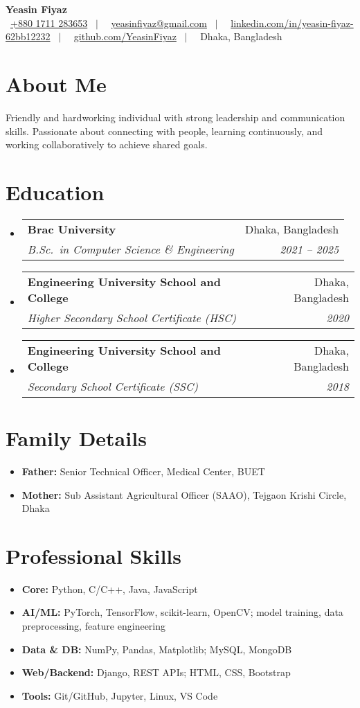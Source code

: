 \documentclass[letterpaper,11pt]{article}
\makeatletter
\newcommand{\resumeSubheading}[4]{%
  \vspace{2pt}\item
  \begin{tabular*}{0.97\textwidth}[t]{l@{\extracolsep{\fill}}r}
  \textbf{#1} & #2 \\
  \textit{\small #3} & \textit{\small #4} \\
  \end{tabular*}\vspace{-6pt}
}
\newcommand{\resumeSubHeadingListStart}{\begin{itemize}[leftmargin=0.15in, label={}]}
\newcommand{\resumeSubHeadingListEnd}{\end{itemize}}
\makeatother
\begin{document}
\begin{center}
    {\Huge \bfseries Yeasin Fiyaz} \\[-1pt]
    \small
    \faMobile\ \href{tel:+8801711283653}{+880 1711 283653} \ $|$ \
    \faAt\ \href{mailto:yeasinfiyaz@gmail.com}{yeasinfiyaz@gmail.com} \ $|$ \
    \faLinkedinSquare\ \href{https://www.linkedin.com/in/yeasin-fiyaz-62bb12232/}{linkedin.com/in/yeasin-fiyaz-62bb12232} \ $|$ \
    \faGithub\ \href{https://github.com/YeasinFiyaz}{github.com/YeasinFiyaz} \ $|$ \
    \faMapMarker\ Dhaka, Bangladesh
\end{center}

\section{About Me}
Friendly and hardworking individual with strong leadership and communication skills. Passionate about connecting with people, learning continuously, and working collaboratively to achieve shared goals.

\section{Education}
\resumeSubHeadingListStart
  \resumeSubheading
    {Brac University}{Dhaka, Bangladesh}
    {B.Sc.\ in Computer Science \& Engineering}{2021 -- 2025}
  \resumeSubheading
    {Engineering University School and College}{Dhaka, Bangladesh}
    {Higher Secondary School Certificate (HSC)}{2020}
  \resumeSubheading
    {Engineering University School and College}{Dhaka, Bangladesh}
    {Secondary School Certificate (SSC)}{2018}
\resumeSubHeadingListEnd


\section{Family Details}
\resumeSubHeadingListStart
\item \textbf{Father:} Senior Technical Officer, Medical Center, BUET
\item \textbf{Mother:} Sub Assistant Agricultural Officer (SAAO), Tejgaon Krishi Circle, Dhaka
\resumeSubHeadingListEnd




\section{Professional Skills}
\resumeSubHeadingListStart
\item \textbf{Core:} Python, C/C++, Java, JavaScript
\item \textbf{AI/ML:} PyTorch, TensorFlow, scikit-learn, OpenCV; model training, data preprocessing, feature engineering
\item \textbf{Data \& DB:} NumPy, Pandas, Matplotlib; MySQL, MongoDB
\item \textbf{Web/Backend:} Django, REST APIs; HTML, CSS, Bootstrap
\item \textbf{Tools:} Git/GitHub, Jupyter, Linux, VS Code
\resumeSubHeadingListEnd
\end{document}

